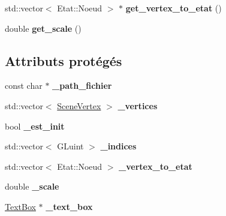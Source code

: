 \begin{DoxyCompactItemize}
\item 
\hypertarget{classStructure_ab67f969bc8fd7f56a0d73ec80938cf20}{std\+::vector$<$ Etat\+::\+Noeud $>$ $\ast$ {\bfseries get\+\_\+vertex\+\_\+to\+\_\+etat} ()}\label{classStructure_ab67f969bc8fd7f56a0d73ec80938cf20}

\item 
\hypertarget{classStructure_a305f02746f56c2931b4f4f5b1dd914c0}{double {\bfseries get\+\_\+scale} ()}\label{classStructure_a305f02746f56c2931b4f4f5b1dd914c0}

\end{DoxyCompactItemize}
\subsection*{Attributs protégés}
\begin{DoxyCompactItemize}
\item 
\hypertarget{classStructure_a917ac1b9830c9315200238f8dffd6629}{const char $\ast$ {\bfseries \+\_\+path\+\_\+fichier}}\label{classStructure_a917ac1b9830c9315200238f8dffd6629}

\item 
\hypertarget{classStructure_a47c08f271a4bbbb1ddd1856ea0f4c898}{std\+::vector$<$ \hyperlink{structSceneVertex}{Scene\+Vertex} $>$ {\bfseries \+\_\+vertices}}\label{classStructure_a47c08f271a4bbbb1ddd1856ea0f4c898}

\item 
\hypertarget{classStructure_a1a7966beabdcc5c4c3bf4dae87d566c7}{bool {\bfseries \+\_\+est\+\_\+init}}\label{classStructure_a1a7966beabdcc5c4c3bf4dae87d566c7}

\item 
\hypertarget{classStructure_a32cafffe9f6e0fc75f56c0f45f14528c}{std\+::vector$<$ G\+Luint $>$ {\bfseries \+\_\+indices}}\label{classStructure_a32cafffe9f6e0fc75f56c0f45f14528c}

\item 
\hypertarget{classStructure_abe612e9759f4be80f1607ab55588c41d}{std\+::vector$<$ Etat\+::\+Noeud $>$ {\bfseries \+\_\+vertex\+\_\+to\+\_\+etat}}\label{classStructure_abe612e9759f4be80f1607ab55588c41d}

\item 
\hypertarget{classStructure_ae5252d1e3682193ca6c1c87af142ad25}{double {\bfseries \+\_\+scale}}\label{classStructure_ae5252d1e3682193ca6c1c87af142ad25}

\item 
\hypertarget{classStructure_a1cb219de9f9ec1875a550c5bc056e6a8}{\hyperlink{classTextBox}{Text\+Box} $\ast$ {\bfseries \+\_\+text\+\_\+box}}\label{classStructure_a1cb219de9f9ec1875a550c5bc056e6a8}

\end{DoxyCompactItemize}


